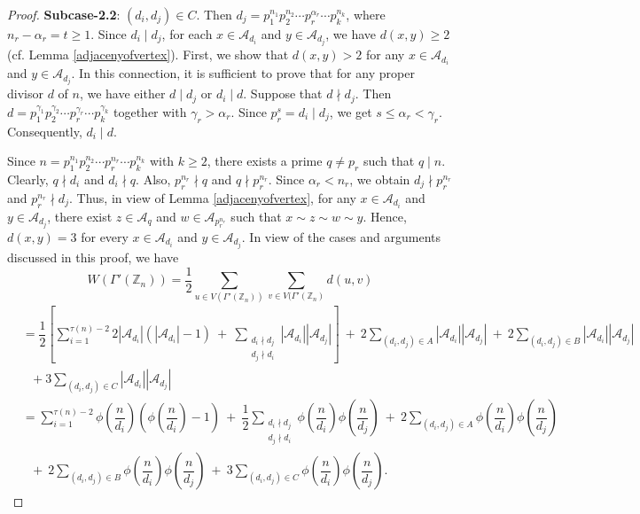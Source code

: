 \documentclass{amsart}
\theoremstyle{plain}
\theoremstyle{definition}
\theoremstyle{remark}
\begin{document}
\begin{proof}
\hspace{.5cm}\textbf{Subcase-2.2}: $(d_i, d_j) \in C$. Then $d_j = p_1^{n_1}p_2^{n_2} \cdots p_r^{\alpha_r} \cdots  p_k^{n_k}$, where $n_r - \alpha_r =t \ge 1$. Since $d_i \mid d_j$, for each $x \in \mathcal{A}_{d_i}$ and $y \in \mathcal{A}_{d_j}$, we have $d(x,y) \geq 2$ (cf. Lemma \ref{adjacenyofvertex}). First, we show that $d(x,y) > 2$ for any $x \in \mathcal{A}_{d_i}$ and $y \in \mathcal{A}_{d_j}$. In this connection, it is sufficient to prove that for any proper divisor $d$ of $n$, we have either $d \mid d_j$ or $d_i \mid d$. Suppose that $d \nmid d_j$. Then $d = p_1^{\gamma_1}p_2^{\gamma_2} \cdots p_r^{\gamma_r} \cdots  p_k^{\gamma_k}$ together with $\gamma_r > \alpha_r$. Since $p_r^s = d_i \mid d_j$, we get $s\leq \alpha_r < \gamma_r$. Consequently, $d_i \mid d$. 

Since $n = p_1^{n_1}p_2^{n_2}\cdots p_r^{n_r} \cdots p_k^{n_k}$ with $k\geq2$, there exists a prime $q \neq p_r$ such that $q \mid n$. Clearly, $q \nmid d_i$ and $d_i \nmid q$. Also, $p_r^{n_r} \nmid q$ and $q \nmid p_r^{n_r}$. Since $\alpha_r < n_r$, we obtain $d_j \nmid p_r^{n_r}$ and $p_r^{n_r} \nmid d_j$. Thus, in view of Lemma \ref{adjacenyofvertex}, for any $x \in \mathcal{A}_{d_i}$ and $y \in \mathcal{A}_{d_j}$, there exist $z \in \mathcal{A}_q $ and $w \in \mathcal{A}_{p_r^{n_r}}$ such that $x \sim z \sim w \sim y$. Hence, $d(x,y) = 3$ for every $x \in \mathcal{A}_{d_i}$ and $y \in \mathcal{A}_{d_j}$. 
In view of the cases and arguments discussed in this proof, we have
\[W(\Gamma'(\mathbb{Z}_n)) = \dfrac{1}{2}\sum_{u \in V(\Gamma'(\mathbb{Z}_n))}\sum_{v \in V(\Gamma'(\mathbb{Z}_n)} d(u,v)  \]
\begin{align*}
&=\dfrac{1}{2} \left[ \sum_{i=1}^{\tau (n)-2} 2 |\mathcal{A}_{d_i}| \left(|\mathcal{A}_{d_i}| -1 \right) \ + \ \sum_{\substack{d_i \nmid d_j \\ d_j \nmid d_i}}|\mathcal{A}_{d_i}||\mathcal{A}_{d_j}| \right] \ + \ 2\sum_{(d_i, d_j) \in A}|\mathcal{A}_{d_i}||\mathcal{A}_{d_j}| \ + \ 2\sum_{(d_i, d_j) \in B}|\mathcal{A}_{d_i}||\mathcal{A}_{d_j}| \\
&\ \ \ + 3\sum_{(d_i, d_j) \in C}|\mathcal{A}_{d_i}||\mathcal{A}_{d_j}| \\
&= \sum_{i=1}^{\tau (n)-2} \phi(\dfrac{n}{d_i}) \left(\phi(\dfrac{n}{d_i}) -1 \right) \ + \ \dfrac{1}{2}\sum_{\substack{d_i \nmid d_j \\ d_j \nmid d_i}}\phi(\dfrac{n}{d_i})\phi(\dfrac{n}{d_j}) \ + \ 2\sum_{(d_i, d_j) \in A}\phi(\dfrac{n}{d_i})\phi(\dfrac{n}{d_j}) \\
&\ \ \ + \ 2\sum_{(d_i, d_j) \in B}\phi(\dfrac{n}{d_i})\phi(\dfrac{n}{d_j}) \ + \ 3\sum_{(d_i, d_j) \in C}\phi(\dfrac{n}{d_i})\phi(\dfrac{n}{d_j}).
\end{align*}
\end{proof}
\end{document}

